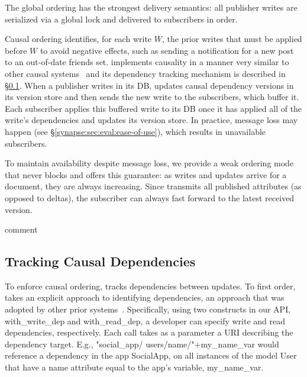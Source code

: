 The global ordering has the strongest delivery semantics: all publisher writes are serialized via a global lock and delivered to subscribers in order.

Causal ordering identifies, for each write $W$, the prior writes that must
be applied before $W$ to avoid negative effects, such as sending a notification
for a new post to an out-of-date friends set.
\synapse implements causality in a manner very similar to other
causal systems~\cite{ahamad1995causal,Birman:1991:LCA:128738.128742,eiger,bolton}
and its dependency tracking mechanism is described in \S\ref{synapse:sec:arch:deps}.
When a publisher writes in its DB, \synapse updates causal dependency versions in its
version store and then sends the new write to the subscribers, which buffer it.
Each subscriber applies this buffered write to its DB once it has applied all
of the write's dependencies and updates its version store.
In practice, message loss may happen (see \S\ref{synapse:sec:eval:ease-of-use}), which
results in unavailable subscribers.

To maintain availability despite message loss, we provide a weak
ordering mode that never blocks and offers this guarantee: as writes and
updates arrive for a document, they are always increasing.
Since \synapse transmits all published attributes (as opposed to deltas), the subscriber can always fast forward to the latest received version.

   comment

\subsection{Tracking Causal Dependencies} \label{synapse:sec:arch:deps}

To enforce causal ordering, \synapse tracks dependencies between updates.  To
first order, \synapse takes an explicit approach to identifying
dependencies, an approach that was adopted by other prior
systems~\cite{bolton,cops,Bailis:2012:PDC:2391229.2391251}.
Specifically, using two constructs in
our API, {\code with\_write\_dep} and {\code with\_read\_dep}, a developer
can specify write and read dependencies, respectively.  Each call takes as a
parameter a URI describing the dependency target. E.g.,
{\code"social\_app/ users/name/"+my\_name\_var} would reference a dependency in
the app {\code SocialApp}, on all instances of the model {\code User} that have
a {\code name} attribute equal to the app's variable, {\code my\_name\_var}.

